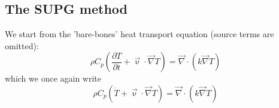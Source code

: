 \subsection{The SUPG method}

We start from the 'bare-bones' heat transport equation (source terms are omitted): 
\begin{equation}
\rho C_p \left( \frac{\partial T}{\partial t} + {\vec \upnu}\cdot {\vec\nabla T} \right)
= {\vec \nabla} \cdot (k \vec\nabla T )
\end{equation}
which we once again write 
\begin{equation}
\rho C_p \left(\dot{T} + {\vec \upnu}\cdot {\vec\nabla T} \right)
= {\vec \nabla} \cdot (k \vec\nabla T )
\end{equation}

